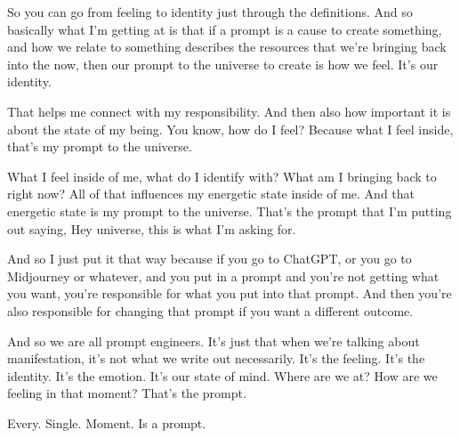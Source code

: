 \documentclass{article}
\begin{document}
\medskip

So you can go from feeling to identity just through the definitions. And so basically what
I'm getting at is that if a prompt is a cause to create something, and how we relate to something
describes the resources that we're bringing back into the now, then our prompt to the universe to create is how we feel. It's our identity. 

\medskip

That helps me connect with my responsibility. And then also how important it is about the state of my being. You know, how do I feel? Because what I feel inside, that's my prompt to the universe. 

\medskip

What I feel inside of me, what do I identify with? What am I bringing back to right now? All of that influences my energetic state inside of me. And that energetic state is my prompt to the universe. That's the prompt that I'm putting out saying, Hey universe, this is what I'm asking for. 

\medskip

And so I just put it that way because if you go to ChatGPT, or you go to Midjourney or whatever, and you put in a prompt and you're not getting what you want, you're responsible for what you put into that prompt. And then you're also responsible for changing that prompt if you want a different outcome. 

\medskip

And so we are all prompt engineers. It's just that when we're talking about manifestation,
it's not what we write out necessarily. It's the feeling. It's the identity. It's the emotion. It's
our state of mind. Where are we at? How are we feeling in that moment? That's the prompt. 

\medskip

Every. Single. Moment. Is a prompt.
\end{document}
